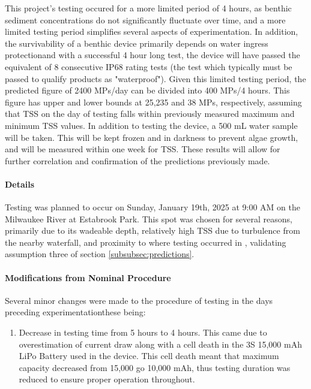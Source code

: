 \documentclass[fleqn,10pt]{SelfArx} %
\begin{document}
	This project's testing occured for a more limited period of 4 hours, as benthic sediment concentrations do not significantly fluctuate over time, and a more limited testing period simplifies several aspects of experimentation. In addition, the survivability of a benthic device primarily depends on water ingress protection\textemdash and with a successful 4 hour long test, the device will have passed the equivalent of 8 consecutive IP68 rating tests (the test which typically must be passed to qualify products as "waterproof"). Given this limited testing period, the predicted figure of 2400 MPs/day can be divided into 400 MPs/4 hours. This figure has upper and lower bounds at 25,235 and 38 MPs, respectively, assuming that TSS on the day of testing falls within previously measured maximum and minimum TSS values.
	\linebreak
	In addition to testing the device, a 500 mL water sample will be taken. This will be kept frozen and in darkness to prevent algae growth, and will be measured within one week for TSS. These results will allow for further correlation and confirmation of the predictions previously made.
	
	\paragraph*{Details}
	Testing was planned to occur on Sunday, January 19th, 2025 at 9:00 AM on the Milwaukee River at Estabrook Park. This spot was chosen for several reasons, primarily due to its wadeable depth, relatively high TSS due to turbulence from the nearby waterfall, and proximity to where testing occurred in \cite{LenakerEtAlvertdist}, validating assumption three of section \ref{subsubsec:predictions}. 
	\paragraph*{Modifications from Nominal Procedure}
	Several minor changes were made to the procedure of testing in the days preceding experimentation\textemdash these being:
	\begin{enumerate}
		\item Decrease in testing time from 5 hours to 4 hours. This came due to overestimation of current draw along with a cell death in the 3S 15,000 mAh LiPo Battery used in the device. This cell death meant that maximum capacity decreased from 15,000 go 10,000 mAh, thus testing duration was reduced to ensure proper operation throughout. 
	\end{enumerate}
\end{document}
